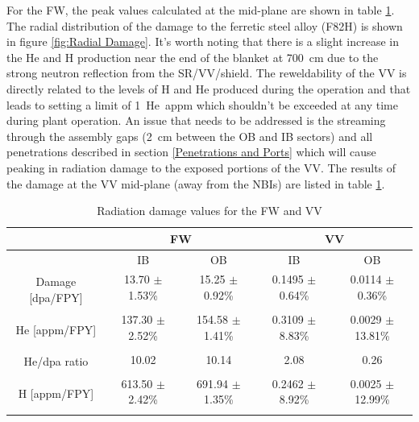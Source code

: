 \documentclass[12pt, letterpaper]{elsarticle}
\begin{document}
For the FW, the peak values calculated at the mid-plane are shown in table \ref{Radiation damage values for the FW and VV}. The radial distribution of the damage to the ferretic steel alloy (F82H) is shown in figure \ref{fig:Radial Damage}. It's worth noting that there is a slight increase in the He and H production near the end of the blanket at \SI{700}{cm} due to the strong neutron reflection from the SR/VV/shield. The reweldability of the VV is directly related to the levels of H and He produced during the operation and that leads to setting a limit of \SI{1}{He appm} which shouldn't be exceeded at any time during plant operation. An issue that needs to be addressed is the streaming through the assembly gaps (\SI{2}{cm} between the OB and IB sectors) and all penetrations described in section \ref{Penetrations and Ports} which will cause peaking in radiation damage to the exposed portions of the VV. The results of the damage at the VV mid-plane (away from the NBIs) are listed in table \ref{Radiation damage values for the FW and VV}.   
\begin{table}
	\caption{Radiation damage values for the FW and VV}
	\label{Radiation damage values for the FW and VV}
	\begin{tabular}{ |c|c|c|c|c| } 
		\hline
		{} & \multicolumn{2}{|c|}{FW} & \multicolumn{2}{|c|}{VV} \\
		\hline
		{} & IB & OB & IB & OB \\
		\hline
		\multirow{2}{6em}{Damage [dpa/FPY]} & 13.70 $\pm$ 1.53\% & 15.25 $\pm$ 0.92\% & 0.1495 $\pm$ 0.64\% & 0.0114 $\pm$ 0.36\%  \\
		& {} & {} & {} & {} \\
		\hline
		\multirow{2}{6em}{He [appm/FPY]} & 137.30 $\pm$ 2.52\% & 154.58 $\pm$ 1.41\% & 0.3109 $\pm$ 8.83\% & 0.0029 $\pm$ 13.81\%  \\
		& {} & {} & {} & {} \\
		\hline
		\multirow{2}{6em}{He/dpa ratio} & 10.02 & 10.14 & 2.08 & 0.26  \\
		& {} & {} & {} & {} \\
		\hline
		\multirow{2}{6em}{H [appm/FPY]} & 613.50 $\pm$ 2.42\% & 691.94 $\pm$ 1.35\% & 0.2462 $\pm$ 8.92\% & 0.0025 $\pm$ 12.99\%  \\
		& {} & {} & {} & {} \\
		\hline
	\end{tabular}
\end{table}
\end{document}
